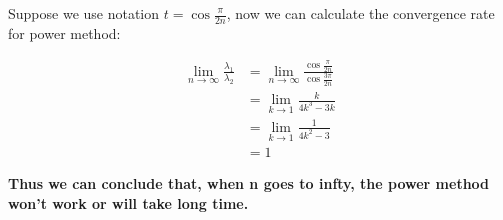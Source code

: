 \documentclass{article}
\begin{document}
\begin{description}
	      Suppose we use notation $t = \cos \frac{\pi}{2n}$, now we can calculate the convergence rate for power method:

	      \begin{align*}
		      \lim_{n\rightarrow \infty}\frac{\lambda_1}{\lambda_2}
		       & = \lim_{n\rightarrow \infty}\frac{\cos \frac{\pi}{2n}}{\cos \frac{3\pi}{2n}} \\
		       & = \lim_{k\rightarrow 1}\frac{k}{4k^3 - 3k}                                   \\
		       & = \lim_{k\rightarrow 1}\frac{1}{4k^2 - 3}                                    \\
		       & = 1
	      \end{align*}

	      \textbf{Thus we can conclude that, when n goes to infty, the power method won't work or will take long time.}
\end{description}
\end{document}
